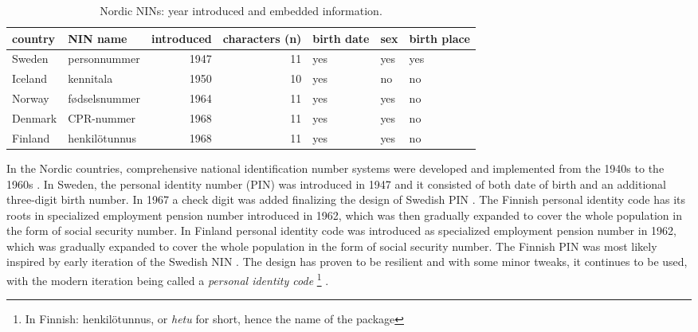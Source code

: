\begin{table}[!h]
\centering
\caption{\label{tab:nin-table}Nordic NINs: year introduced and embedded information.}
\centering
\begin{tabular}[t]{llrrlll}
\toprule
country & NIN name & introduced & characters (n) & birth date & sex & birth place\\
\midrule
Sweden & personnummer & 1947 & 11 & yes & yes & yes\\
Iceland & kennitala & 1950 & 10 & yes & no & no\\
Norway & fødselsnummer & 1964 & 11 & yes & yes & no\\
Denmark & CPR-nummer & 1968 & 11 & yes & yes & no\\
Finland & henkilötunnus & 1968 & 11 & yes & yes & no\\
\bottomrule
\end{tabular}
\end{table}

In the Nordic countries, comprehensive national identification number systems were developed and implemented from the 1940s to the 1960s \citep{watson2010}. In Sweden, the personal identity number (PIN) was introduced in 1947 and it consisted of both date of birth and an additional three-digit birth number. In 1967 a check digit was added finalizing the design of Swedish PIN \citep{johansson2003, scb2016}. The Finnish personal identity code has its roots in specialized employment pension number introduced in 1962, which was then gradually expanded to cover the whole population in the form of social security number. In Finland personal identity code was introduced as specialized employment pension number in 1962, which was gradually expanded to cover the whole population in the form of social security number. The Finnish PIN was most likely inspired by early iteration of the Swedish NIN \citep{alastalo2022}. The design has proven to be resilient and with some minor tweaks, it continues to be used, with the modern iteration being called a \emph{personal identity code} \footnote{In Finnish: henkilötunnus, or \emph{hetu} for short, hence the name of the package} \citep{salste2021}.


